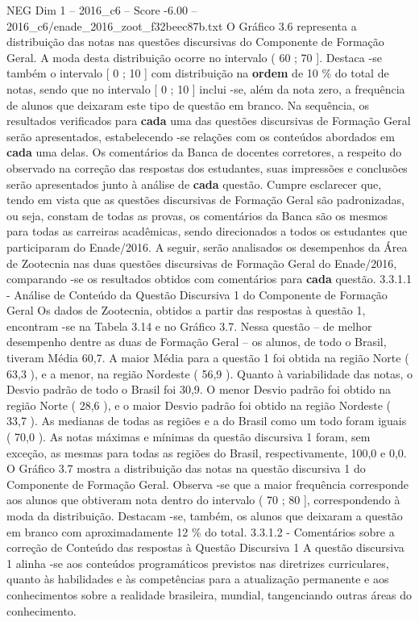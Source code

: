 \begin{textsample}{NEG Dim 1 – 2016\_c6 – Score -6.00 – 2016\_c6/enade\_2016\_zoot\_f32beec87b.txt}
O Gráfico 3.6 representa a distribuição das notas nas questões discursivas do Componente de Formação Geral.
A moda desta distribuição ocorre no intervalo ( 60 ; 70 ].
Destaca -se também o intervalo [ 0 ; 10 ] com distribuição na \textbf{ordem} de 10 \% do total de notas, sendo que no intervalo [ 0 ; 10 ] inclui -se, além da nota zero, a frequência de alunos que deixaram este tipo de questão em branco.
Na sequência, os resultados verificados para \textbf{cada} uma das questões discursivas de Formação Geral serão apresentados, estabelecendo -se relações com os conteúdos abordados em \textbf{cada} uma delas.
Os comentários da Banca de docentes corretores, a respeito do observado na correção das respostas dos estudantes, suas impressões e conclusões serão apresentados junto à análise de \textbf{cada} questão.
Cumpre esclarecer que, tendo em vista que as questões discursivas de Formação Geral são padronizadas, ou seja, constam de todas as provas, os comentários da Banca são os mesmos para todas as carreiras acadêmicas, sendo direcionados a todos os estudantes que participaram do Enade/2016.
A seguir, serão analisados os desempenhos da Área de Zootecnia nas duas questões discursivas de Formação Geral do Enade/2016, comparando -se os resultados obtidos com comentários para \textbf{cada} questão. 3.3.1.1 - Análise de Conteúdo da Questão Discursiva 1 do Componente de Formação Geral Os dados de Zootecnia, obtidos a partir das respostas à questão 1, encontram -se na Tabela 3.14 e no Gráfico 3.7.
Nessa questão – de melhor desempenho dentre as duas de Formação Geral – os alunos, de todo o Brasil, tiveram Média 60,7.
A maior Média para a questão 1 foi obtida na região Norte ( 63,3 ), e a menor, na região Nordeste ( 56,9 ).
Quanto à variabilidade das notas, o Desvio padrão de todo o Brasil foi 30,9.
O menor Desvio padrão foi obtido na região Norte ( 28,6 ), e o maior Desvio padrão foi obtido na região Nordeste ( 33,7 ).
As medianas de todas as regiões e a do Brasil como um todo foram iguais ( 70,0 ).
As notas máximas e mínimas da questão discursiva 1 foram, sem exceção, as mesmas para todas as regiões do Brasil, respectivamente, 100,0 e 0,0.
O Gráfico 3.7 mostra a distribuição das notas na questão discursiva 1 do Componente de Formação Geral.
Observa -se que a maior frequência corresponde aos alunos que obtiveram nota dentro do intervalo ( 70 ; 80 ], correspondendo à moda da distribuição.
Destacam -se, também, os alunos que deixaram a questão em branco com aproximadamente 12 \% do total. 3.3.1.2 - Comentários sobre a correção de Conteúdo das respostas à Questão Discursiva 1 A questão discursiva 1 alinha -se aos conteúdos programáticos previstos nas diretrizes curriculares, quanto às habilidades e às competências para a atualização permanente e aos conhecimentos sobre a realidade brasileira, mundial, tangenciando outras áreas do conhecimento.

\end{textsample}
